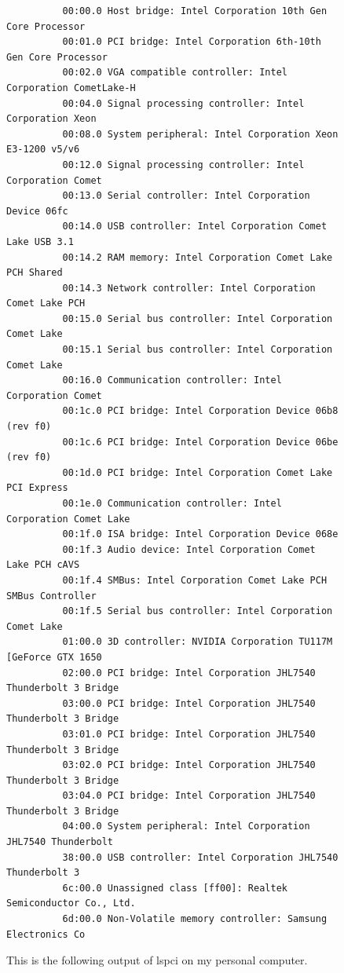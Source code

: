 \documentclass{article}
\begin{document}
      \begin{figure}[hbt!]
        \centering 
        \begin{lstlisting} 
          00:00.0 Host bridge: Intel Corporation 10th Gen Core Processor 
          00:01.0 PCI bridge: Intel Corporation 6th-10th Gen Core Processor 
          00:02.0 VGA compatible controller: Intel Corporation CometLake-H 
          00:04.0 Signal processing controller: Intel Corporation Xeon 
          00:08.0 System peripheral: Intel Corporation Xeon E3-1200 v5/v6 
          00:12.0 Signal processing controller: Intel Corporation Comet 
          00:13.0 Serial controller: Intel Corporation Device 06fc
          00:14.0 USB controller: Intel Corporation Comet Lake USB 3.1 
          00:14.2 RAM memory: Intel Corporation Comet Lake PCH Shared 
          00:14.3 Network controller: Intel Corporation Comet Lake PCH
          00:15.0 Serial bus controller: Intel Corporation Comet Lake 
          00:15.1 Serial bus controller: Intel Corporation Comet Lake 
          00:16.0 Communication controller: Intel Corporation Comet 
          00:1c.0 PCI bridge: Intel Corporation Device 06b8 (rev f0)
          00:1c.6 PCI bridge: Intel Corporation Device 06be (rev f0)
          00:1d.0 PCI bridge: Intel Corporation Comet Lake PCI Express
          00:1e.0 Communication controller: Intel Corporation Comet Lake 
          00:1f.0 ISA bridge: Intel Corporation Device 068e
          00:1f.3 Audio device: Intel Corporation Comet Lake PCH cAVS
          00:1f.4 SMBus: Intel Corporation Comet Lake PCH SMBus Controller
          00:1f.5 Serial bus controller: Intel Corporation Comet Lake 
          01:00.0 3D controller: NVIDIA Corporation TU117M [GeForce GTX 1650 
          02:00.0 PCI bridge: Intel Corporation JHL7540 Thunderbolt 3 Bridge
          03:00.0 PCI bridge: Intel Corporation JHL7540 Thunderbolt 3 Bridge
          03:01.0 PCI bridge: Intel Corporation JHL7540 Thunderbolt 3 Bridge
          03:02.0 PCI bridge: Intel Corporation JHL7540 Thunderbolt 3 Bridge
          03:04.0 PCI bridge: Intel Corporation JHL7540 Thunderbolt 3 Bridge
          04:00.0 System peripheral: Intel Corporation JHL7540 Thunderbolt 
          38:00.0 USB controller: Intel Corporation JHL7540 Thunderbolt 3 
          6c:00.0 Unassigned class [ff00]: Realtek Semiconductor Co., Ltd. 
          6d:00.0 Non-Volatile memory controller: Samsung Electronics Co 
        \end{lstlisting}
        \caption{This is the following output of lspci on my personal computer. } 
        \label{fig:pci_device}
      \end{figure}
\end{document}
